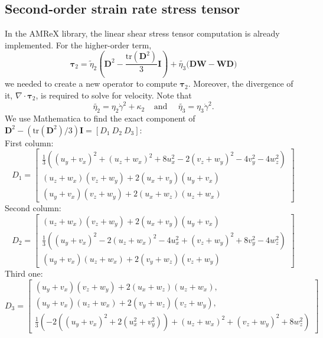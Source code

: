 \subsection{Second-order strain rate stress tensor}
In the AMReX library, the linear shear stress tensor computation is already implemented. For the higher-order term,
\[
  {\bm \tau}_{2} = 
  \tilde{\eta}_2
  \left( {\bm D}^2  - \frac{\text{tr}\left({\bm D}^2\right)}{3}{\bm I} \right)
  + \tilde{\eta_3} 
  \biggl( {\bm{DW}} - {\bm{WD}} \biggr)  
\]
we needed to create a new operator to compute $ {\bm \tau}_{2}$. Moreover, the divergence of it, $\nabla \cdot {\bm \tau}_{2}$, is required to solve for velocity. Note that 
\[
\tilde{\eta_2} =  \eta_2  \dot{\gamma}^2
+  \kappa_2 
\ \ \ \ \ \text{and} \ \ \ \ \ \
\tilde{\eta_3} =    \eta_3 \dot{\gamma}^2 .
\]
We use Mathematica to find the exact component of  ${\bm D}^2 - (\text{tr}({\bm D}^2)/3) {\bm I} = \left[ D_1  \ D_2 \ D_3 \right]$:
\\
First column:
\[
D_1 =
\begin{bmatrix}
   \frac{1}{3} \left(\left(u_y+v_x\right)^2+\left(u_z+w_x\right)^2+8 u_x^2-2 \left(v_z+w_y\right)^2-4 v_y^2-4 w_z^2\right)
   \\
   \left(u_z+w_x\right) \left(v_z+w_y\right)+2 \left(u_x+v_y\right) \left(u_y+v_x\right)
   \\
   \left(u_y+v_x\right) \left(v_z+w_y\right)+2 \left(u_x+w_z\right) \left(u_z+w_x\right)
\end{bmatrix}
\]
Second column:
\[
D_2 = 
\begin{bmatrix}
   \left(u_z+w_x\right) \left(v_z+w_y\right)+2 \left(u_x+v_y\right) \left(u_y+v_x\right)
   \\
   \frac{1}{3} \left(\left(u_y+v_x\right)^2-2 \left(u_z+w_x\right)^2-4 u_x^2+\left(v_z+w_y\right)^2+8 v_y^2-4 w_z^2\right)
   \\
   \left(u_y+v_x\right) \left(u_z+w_x\right)+2 \left(v_y+w_z\right) \left(v_z+w_y\right)
\end{bmatrix}
\]
Third one:
\[
D_3 = 
\begin{bmatrix}
   \left(u_y+v_x\right) \left(v_z+w_y\right)+2 \left(u_x+w_z\right) \left(u_z+w_x\right),
    \\
   \left(u_y+v_x\right) \left(u_z+w_x\right)+2 \left(v_y+w_z\right) \left(v_z+w_y\right),
   \\
   \frac{1}{3} \left(-2 \left(\left(u_y+v_x\right)^2+2 \left(u_x^2+v_y^2\right)\right)+\left(u_z+w_x\right)^2+\left(v_z+w_y\right)^2+8 w_z^2\right)
\end{bmatrix}
\]
